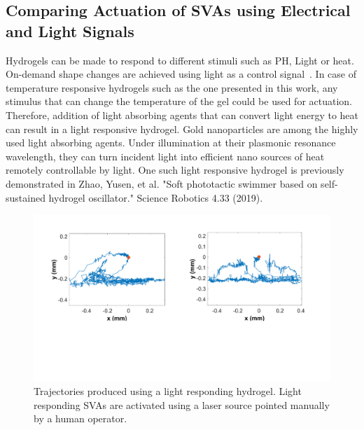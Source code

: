 \subsection{Comparing Actuation of SVAs using Electrical and Light Signals}
\label{subsec:elecVSlight}
Hydrogels can be made to respond to different stimuli such as PH, Light or heat. On-demand shape changes are achieved using light as a control signal~\cite{Wang2015b}. In case of temperature responsive hydrogels such as the one presented in this work, any stimulus that can change the temperature of the gel could be used for actuation. Therefore, addition of light absorbing agents that can convert light energy to heat can result in a light responsive hydrogel. Gold nanoparticles are among the highly used light absorbing agents. Under illumination at their plasmonic resonance wavelength, they can turn incident light into efficient nano sources of heat remotely controllable by light. One such light responsive hydrogel is previously demonstrated in {Zhao, Yusen, et al. "Soft phototactic swimmer based on self-sustained hydrogel oscillator." Science Robotics 4.33 (2019).}
\begin{figure}[!th]
      \centering
      \includegraphics[width=1\textwidth]{Fig4.pdf}
      \caption[]{Trajectories produced using a light responding hydrogel. Light responding SVAs are activated using a laser source pointed manually by a human operator.}
      \label{fig:laser}
\end{figure}
